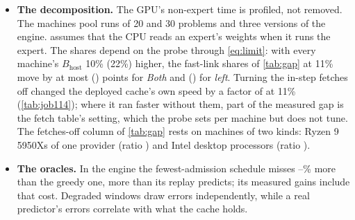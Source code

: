 \begin{itemize}
\dmEqThreeLeftSlowLowMin--\dmEqThreeLeftSlowLowMax\% of the gap to it on the two slow-link panel machines and
\dmEqThreeLeftCardLowMin--\dmEqThreeLeftCardLowMax\% on the three slow-link RTX 4090s, against a median of
\dmEqThreeLeftFastLowMed\% on fast links: the oracles fetch their misses over the link, the slow path there.
\item \textbf{The decomposition.} The GPU's non-expert time is profiled, not removed. The machines pool runs of 20 and
30 problems and three versions of the engine.  assumes that the CPU reads an expert's weights when it
runs the expert. The shares depend on the probe through \cref{eq:limit}: with every machine's $B_{\mathrm{host}}$ 10\%
(22\%) higher, the fast-link shares of \cref{tab:gap} at 11\% move by at most \dmProbeTenTogetherLowMax{}
(\dmProbeTwentyTwoTogetherLowMax) points for \emph{Both} and \dmProbeTenLeftLowMax{} (\dmProbeTwentyTwoLeftLowMax) for
\emph{left}. Turning the in-step fetches off changed the deployed cache's own speed by a factor of \dpBaseZeroLowRng{} at 11\%
(\cref{tab:job114}); where it ran faster without them, part of the measured gap is the fetch table's setting, which the
probe sets per machine but does not tune. The fetches-off column of \cref{tab:gap} rests on \dpNWord{} machines of two kinds: \dpHiRatioN{} Ryzen 9 5950Xs of one
provider (ratio \dpRatioHiRatioRng) and \dpLoRatioN{} Intel desktop processors (ratio \dpRatioLoRatioRng).
\item \textbf{The oracles.} In the engine the fewest-admission schedule misses \jfMissDevMin--\jfMissDevMax\% more than
the greedy one, more than its replay predicts; its measured gains include that cost. Degraded windows draw errors
independently, while a real predictor's errors correlate with what the cache holds.
\end{itemize}
